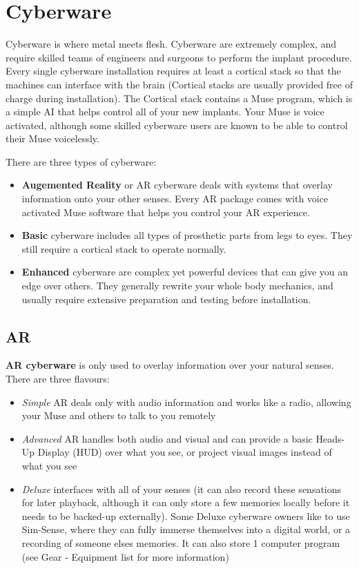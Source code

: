 
\section{Cyberware}

\begin{multicols}{2}

Cyberware is where metal meets flesh. Cyberware are extremely complex, and require skilled teams of engineers and surgeons to perform the implant procedure. Every single cyberware installation requires at least a cortical stack so that the machines can interface with the brain (Cortical stacks are usually provided free of charge during installation). The Cortical stack contains a Muse program, which is a simple AI that helps control all of your new implants. Your Muse is voice activated, although some skilled cyberware users are known to be able to control their Muse voicelessly.

There are three types of cyberware:

\begin{itemize}
  \item \textbf{Augemented Reality} or AR cyberware deals with systems that overlay information onto your other senses. Every AR package comes with voice activated Muse software that helps you control your AR experience.
  \item \textbf{Basic} cyberware includes all types of prosthetic parts from legs to eyes. They still require a cortical stack to operate normally.
  \item \textbf{Enhanced} cyberware are complex yet powerful devices that can give you an edge over others. They generally rewrite your whole body mechanics, and usually require extensive preparation and testing before installation.
\end{itemize}

\subsection{AR}

\textbf{AR cyberware} is only used to overlay information over your natural senses. There are three flavours: 
\begin{itemize}
  \item \textit{Simple} AR deals only with audio information and works like a radio, allowing your Muse and others to talk to you remotely
  \item \textit{Advanced} AR handles both audio and visual and can provide a basic Heads-Up Display (HUD) over what you see, or project visual images instead of what you see
  \item \textit{Deluxe} interfaces with all of your senses (it can also record these sensations for later playback, although it can only store a few memories locally before it needs to be backed-up externally). Some Deluxe cyberware owners like to use Sim-Sense, where they can fully immerse themselves into a digital world, or a recording of someone elses memories. It can also store 1 computer program (see Gear - Equipment list for more information)
\end{itemize}


\end{multicols}
